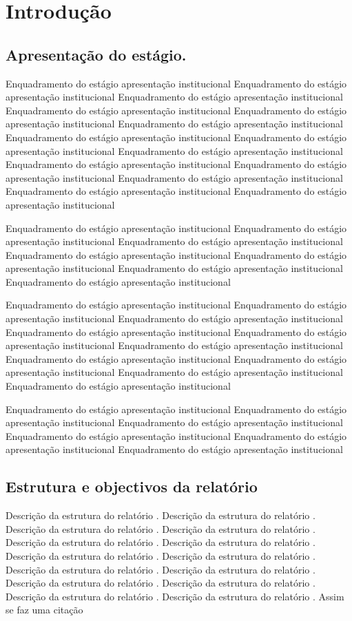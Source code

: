 \chapter{Introdução}

\section{Apresentação do estágio.}\label{isec:hist}
Enquadramento do estágio apresentação institucional Enquadramento do
estágio apresentação institucional Enquadramento do estágio apresentação
institucional Enquadramento do estágio apresentação institucional
Enquadramento do estágio apresentação institucional Enquadramento do
estágio apresentação institucional Enquadramento do estágio apresentação
institucional Enquadramento do estágio apresentação institucional
Enquadramento do estágio apresentação institucional Enquadramento do
estágio apresentação institucional
Enquadramento do estágio apresentação institucional Enquadramento do
estágio apresentação institucional Enquadramento do estágio apresentação
institucional Enquadramento do estágio apresentação institucional

Enquadramento do estágio apresentação institucional Enquadramento do
estágio apresentação institucional Enquadramento do estágio apresentação
institucional Enquadramento do estágio apresentação institucional
Enquadramento do estágio apresentação institucional Enquadramento do
estágio apresentação institucional Enquadramento do estágio apresentação
institucional

Enquadramento do estágio apresentação institucional Enquadramento do
estágio apresentação institucional Enquadramento do estágio apresentação
institucional Enquadramento do estágio apresentação institucional
Enquadramento do estágio apresentação institucional Enquadramento do
estágio apresentação institucional Enquadramento do estágio apresentação
institucional
Enquadramento do estágio apresentação institucional Enquadramento do
estágio apresentação institucional Enquadramento do estágio apresentação
institucional


Enquadramento do estágio apresentação institucional Enquadramento do estágio apresentação institucional Enquadramento do estágio apresentação institucional Enquadramento do estágio apresentação institucional Enquadramento do estágio apresentação institucional Enquadramento do estágio apresentação institucional


\section{Estrutura e objectivos da relatório}
Descrição da estrutura do relatório . Descrição da estrutura do
relatório . Descrição da estrutura do relatório . Descrição da estrutura
do relatório . Descrição da estrutura do relatório . Descrição da
estrutura do relatório . Descrição da estrutura do relatório . Descrição
da estrutura do relatório . Descrição da estrutura do relatório
. Descrição da estrutura do relatório . Descrição da estrutura do
relatório . Descrição da estrutura do relatório . Descrição da estrutura
do relatório . Descrição da estrutura do relatório .
Assim se faz uma citação ~\cite{ufl2009}

